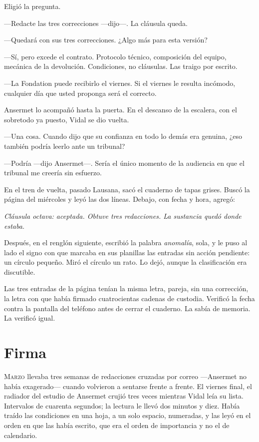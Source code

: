 Eligió la pregunta.

---Redacte las tres correcciones ---dijo---. La cláusula queda.

---Quedará con sus tres correcciones. ¿Algo más para esta versión?

---Sí, pero excede el contrato. Protocolo técnico, composición del equipo, mecánica de la devolución. Condiciones, no cláusulas. Las traigo por escrito.

---La Fondation puede recibirlo el viernes. Si el viernes le resulta incómodo, cualquier día que usted proponga será el correcto.

Ansermet lo acompañó hasta la puerta. En el descanso de la escalera, con el sobretodo ya puesto, Vidal se dio vuelta.

---Una cosa. Cuando dijo que su confianza en todo lo demás era genuina, ¿eso también podría leerlo ante un tribunal?

---Podría ---dijo Ansermet---. Sería el único momento de la audiencia en que el tribunal me creería sin esfuerzo.


\scenebreak


En el tren de vuelta, pasado Lausana, sacó el cuaderno de tapas grises. Buscó la página del miércoles y leyó las dos líneas. Debajo, con fecha y hora, agregó:

\textit{Cláusula octava: aceptada. Obtuve tres redacciones. La sustancia quedó donde estaba.}

Después, en el renglón siguiente, escribió la palabra \textit{anomalía}, sola, y le puso al lado el signo con que marcaba en sus planillas las entradas sin acción pendiente: un círculo pequeño. Miró el círculo un rato. Lo dejó, aunque la clasificación era discutible.

Las tres entradas de la página tenían la misma letra, pareja, sin una corrección, la letra con que había firmado cuatrocientas cadenas de custodia. Verificó la fecha contra la pantalla del teléfono antes de cerrar el cuaderno. La sabía de memoria. La verificó igual.

\clearpage

\chapter{Firma}

\lettrine[lines=2, lhang=0.1, nindent=0.2em]{M}{arzo} llevaba tres semanas de redacciones cruzadas por correo ---Ansermet no había exagerado--- cuando volvieron a sentarse frente a frente. El viernes final, el radiador del estudio de Ansermet crujió tres veces mientras Vidal leía su lista. Intervalos de cuarenta segundos; la lectura le llevó dos minutos y diez. Había traído las condiciones en una hoja, a un solo espacio, numeradas, y las leyó en el orden en que las había escrito, que era el orden de importancia y no el de calendario.


